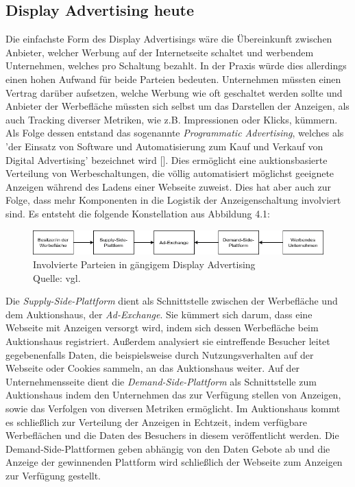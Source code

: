 \subsection{Display Advertising heute}


Die einfachste Form des Display Advertisings wäre die Übereinkunft zwischen Anbieter, welcher Werbung auf der Internetseite schaltet und werbendem Unternehmen, welches pro Schaltung bezahlt. In der Praxis würde dies allerdings einen hohen Aufwand für beide Parteien bedeuten. Unternehmen müssten einen Vertrag darüber aufsetzen, welche Werbung wie oft geschaltet werden sollte und Anbieter der Werbefläche müssten sich selbst um das Darstellen der Anzeigen, als auch Tracking diverser Metriken, wie z.B. Impressionen oder Klicks, kümmern.\\

Als Folge dessen entstand das sogenannte \emph{Programmatic Advertising}, welches als 'der Einsatz von Software und Automatisierung zum Kauf und Verkauf von Digital Advertising' bezeichnet wird [\cite[4]{optimity_advisors_2019}]. Dies ermöglicht eine auktionsbasierte Verteilung von Werbeschaltungen, die völlig automatisiert möglichst geeignete Anzeigen während des Ladens einer Webseite zuweist. Dies hat aber auch zur Folge, dass mehr Komponenten in die Logistik der Anzeigenschaltung involviert sind. Es entsteht die folgende Konstellation aus Abbildung 4.1:

\begin{figure}[htpb]
	\centering
	\includegraphics[width=\textwidth]{images/programmatic_advertising.png}
	\caption{Involvierte Parteien in gängigem Display Advertising\\
	Quelle: vgl. \cite[9]{optimity_advisors_2019}}
	\label{6braun:fig:programmatic_advertising}
\end{figure}
Die \emph{Supply-Side-Plattform} dient als Schnittstelle zwischen der Werbefläche und dem Auktionshaus, der \emph{Ad-Exchange}. Sie kümmert sich darum, dass eine Webseite mit Anzeigen versorgt wird, indem sich dessen Werbefläche beim Auktionshaus registriert. Außerdem analysiert sie eintreffende Besucher leitet gegebenenfalls Daten, die beispielsweise durch Nutzungsverhalten auf der Webseite oder Cookies sammeln, an das Auktionshaus weiter. Auf der Unternehmensseite dient die \emph{Demand-Side-Plattform} als Schnittstelle zum Auktionshaus indem den Unternehmen das zur Verfügung stellen von Anzeigen, sowie das Verfolgen von diversen Metriken ermöglicht. Im Auktionshaus kommt es schließlich zur Verteilung der Anzeigen in Echtzeit, indem verfügbare Werbeflächen und die Daten des Besuchers in diesem veröffentlicht werden. Die Demand-Side-Plattformen geben abhängig von den Daten Gebote ab und die Anzeige der gewinnenden Plattform wird schließlich der Webseite zum Anzeigen zur Verfügung gestellt.\\

